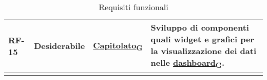 \begin{longtable}{|>{\centering\arraybackslash}m{}|>{\centering\arraybackslash}m{}|>{\centering\arraybackslash}m{}|>{\centering\arraybackslash}m{}|}
	RF-15           & Desiderabile        & \href{https://7last.github.io/docs/rtb/documentazione-interna/glossario#capitolato}{Capitolato\textsubscript{G}}     & Sviluppo di componenti quali widget e grafici per la visualizzazione dei dati nelle \href{https://7last.github.io/docs/rtb/documentazione-interna/glossario#dashboard}{dashboard\textsubscript{G}}.                                                                                                                                                                                                                     \\\hline

	\caption{Requisiti funzionali}
	\label{table:1}
\end{longtable}

